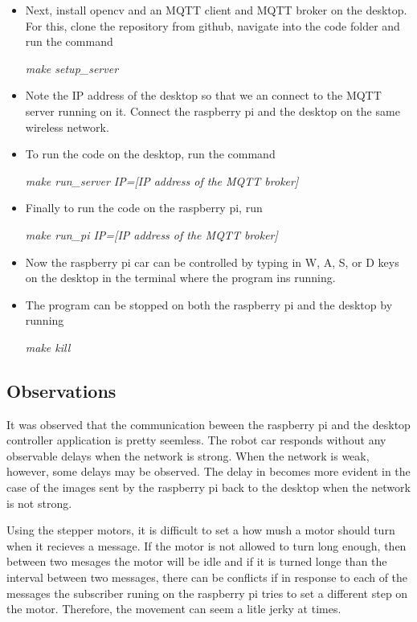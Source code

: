 \documentclass[sigconf]{acmart}
\begin{document}
\begin{itemize}
{\em make setup\_pi}

\item Next, install opencv and an MQTT client and MQTT broker on the desktop. For this, clone the repository from github, navigate into the code folder and run the command 

{\em make setup\_server}

\item Note the IP address of the desktop so that we an connect to the MQTT server running on it. Connect the raspberry pi and the desktop on the same wireless network.

\item To run the code on the desktop, run the command

{\em make run\_server IP=[IP address of the MQTT broker]}

\item Finally to run the code on the raspberry pi, run 

{\em make run\_pi IP=[IP address of the MQTT broker]}

\item Now the raspberry pi car can be controlled by typing in  W, A, S, or D keys on the desktop in the terminal where the program ins running.

\item The program can be stopped on both the raspberry pi and the desktop by running 

{\em make kill}

\end{itemize}

\subsection{Observations}
It was observed that the communication beween the raspberry pi and the desktop controller application is pretty seemless. The robot car responds without any observable delays when the network is strong. When the network is weak, however, some delays may be observed. The delay in becomes more evident in the case of the images sent by the raspberry pi back to the desktop when the network is not strong.

Using the stepper motors, it is difficult to set a how mush a motor should turn when it recieves a message. If the motor is not allowed to turn long enough, then between two mesages the motor will be idle and if it is turned longe than the interval between two messages, there can be conflicts if in response to each of the messages the subscriber runing on the raspberry pi tries to set a different step on the motor. Therefore, the movement can seem a litle jerky at times.
\end{document}

